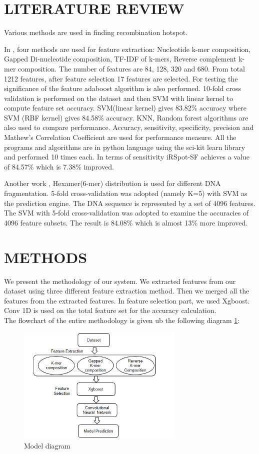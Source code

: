 \documentclass[letterpaper, 10 pt, conference]{ieeeconf}  %
\begin{document}
 
\section{LITERATURE REVIEW} 
Various methods are used in finding recombination hotspot. 

In \cite{al2019irspot}, four methods are used for feature extraction: Nucleotide k-mer composition, Gapped Di-nucleotide composition, TF-IDF of k-mers, Reverse complement k-mer composition. The number of features are 84, 128, 320 and 680. From total 1212 features, after feature selection 17 features are selected. For testing the significance of the feature adaboost algorithm is also performed. 
10-fold cross validation is performed on the dataset and then SVM with linear kernel to compute feature set accuracy. SVM(linear kernel) gives 83.82\% accuracy where SVM (RBF kernel) gives 84.58\% accuracy. KNN, Random forest algorithms are also used to compare performance. Accuracy, sensitivity, specificity, precision and Mathew's Correlation Coefficient are used for performance measure. All the programs and algorithms are in python language using the sci-kit learn library and performed 10 times each. In terms of sensitivity iRSpot-SF achieves a value of 84.57\% which is 7.38\% improved. 

Another work \cite{yang2018irspot}, Hexamer(6-mer) distribution is used for different DNA fragmentation. 5-fold cross-validation was adopted (namely K=5) with SVM as the prediction engine. The DNA sequence is represented by a set of 4096 features. The SVM with 5-fold cross-validation was adopted to examine the accuracies of 4096 feature subsets. The result is 84.08\% which is almost 13\% more improved. 

\section{METHODS}
We present the methodology of our system. We extracted features from our dataset using three different feature extraction method. Then we merged all the features from the extracted features. In feature selection part, we used Xgboost. Conv 1D is used on the total feature set for the accuracy calculation. \\
The flowchart of the entire methodology is given ub the following diagram \ref{fig:system}:

\begin{figure}[htp]
    \centering
    \includegraphics[width=8cm]{images/system.PNG}
    \caption{Model diagram}
    \label{fig:system}
\end{figure}
\end{document}
